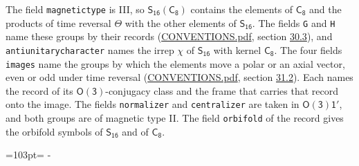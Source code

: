 \documentclass[10pt,a4paper]{article}
\newcommand{\needspace}[1]{\par\penalty-100\begingroup\dimen0=#1\relax\dimen2=\pagegoal
  \advance\dimen2-\pagetotal\ifdim\dimen0>\dimen2\relax\ifdim\dimen2>0pt\vfil\break\fi\fi
  \endgroup}
\numberwithin{equation}{section}
\newcommand{\grp}[1]{\mathsf{#1}}
\begin{document}
The field \texttt{magnetictype} is III, so $\grp{S_{16}}(\grp{C_{8}})$ contains the elements of $\grp{C_{8}}$ and the products of time reversal $\varTheta$ with the other elements of $\grp{S_{16}}$. The fields \texttt{G} and \texttt{H} name these groups by their records (\href{../../CONVENTIONS.pdf}{CONVENTIONS.pdf}, section \href{../../CONVENTIONS.pdf\#conv.30.3}{30.3}), and \texttt{antiunitarycharacter} names the irrep $\chi$ of $\grp{S_{16}}$ with kernel $\grp{C_{8}}$. The four fields \texttt{images} name the groups by which the elements move a polar or an axial vector, even or odd under time reversal (\href{../../CONVENTIONS.pdf}{CONVENTIONS.pdf}, section \href{../../CONVENTIONS.pdf\#conv.31.2}{31.2}). Each names the record of its $\grp{O(3)}$-conjugacy class and the frame that carries that record onto the image. The fields \texttt{normalizer} and \texttt{centralizer} are taken in $\grp{O(3)1'}$, and both groups are of magnetic type II. The field \texttt{orbifold} of the record gives the orbifold symbols of $\grp{S_{16}}$ and of $\grp{C_{8}}$.
\needspace{103pt}
\end{document}
